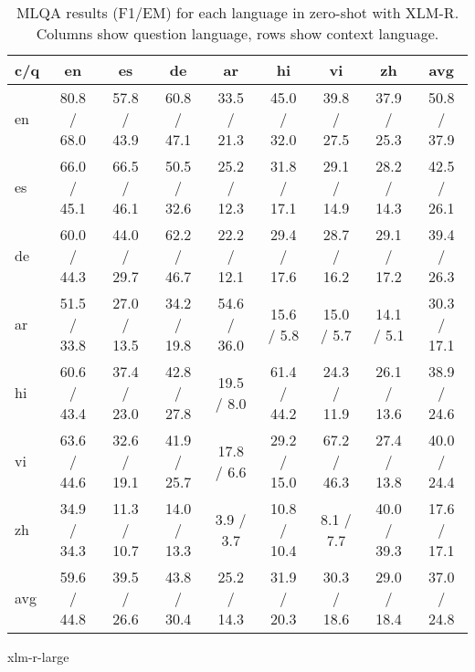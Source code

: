 \documentclass[11pt]{article}
\begin{document}
\begin{table*}[!ht]
    \centering
    \begin{adjustbox}{max width=\textwidth}
    \begin{tabular}{l|ccccccc|c}
    \toprule
        c/q & en & es & de & ar & hi & vi & zh & avg \\ \midrule
        en & 80.8 / 68.0 & 57.8 / 43.9 & 60.8 / 47.1 & 33.5 / 21.3 & 45.0 / 32.0 & 39.8 / 27.5 & 37.9 / 25.3 & 50.8 / 37.9 \\ 
        es & 66.0 / 45.1 & 66.5 / 46.1 & 50.5 / 32.6 & 25.2 / 12.3 & 31.8 / 17.1 & 29.1 / 14.9 & 28.2 / 14.3 & 42.5 / 26.1 \\ 
        de & 60.0 / 44.3 & 44.0 / 29.7 & 62.2 / 46.7 & 22.2 / 12.1 & 29.4 / 17.6 & 28.7 / 16.2 & 29.1 / 17.2 & 39.4 / 26.3 \\ 
        ar & 51.5 / 33.8 & 27.0 / 13.5 & 34.2 / 19.8 & 54.6 / 36.0 & 15.6 / 5.8 & 15.0 / 5.7 & 14.1 / 5.1 & 30.3 / 17.1 \\ 
        hi & 60.6 / 43.4 & 37.4 / 23.0 & 42.8 / 27.8 & 19.5 / 8.0 & 61.4 / 44.2 & 24.3 / 11.9 & 26.1 / 13.6 & 38.9 / 24.6 \\ 
        vi & 63.6 / 44.6 & 32.6 / 19.1 & 41.9 / 25.7 & 17.8 / 6.6 & 29.2 / 15.0 & 67.2 / 46.3 & 27.4 / 13.8 & 40.0 / 24.4 \\ 
        zh & 34.9 / 34.3 & 11.3 / 10.7 & 14.0 / 13.3 & 3.9 / 3.7 & 10.8 / 10.4 & 8.1 / 7.7 & 40.0 / 39.3 & 17.6 / 17.1 \\ \midrule
        avg & 59.6 / 44.8 & 39.5 / 26.6 & 43.8 / 30.4 & 25.2 / 14.3 & 31.9 / 20.3 & 30.3 / 18.6 & 29.0 / 18.4 & 37.0 / 24.8 \\ \bottomrule
    \end{tabular}
    \end{adjustbox}
    \caption{MLQA results (F1/EM) for each language in zero-shot with XLM-R. Columns show question language, rows show context language.}
    \label{MLQA_results_ZS_XLM-R}
\end{table*}



xlm-r-large
\end{document}
